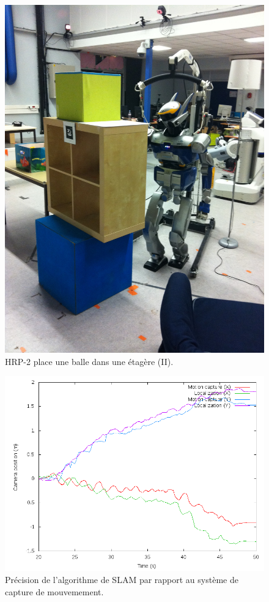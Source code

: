 \begin{figure}
  \begin{center}
    \includegraphics[width=.95\linewidth]{src/chap3-primitive-mouvement/demo2.jpg}
  \end{center}
  \caption{HRP-2 place une balle dans une étagère (II).}
\end{figure}


\begin{figure}
  \begin{center}
    \includegraphics[width=.95\linewidth]{src/chap3-primitive-mouvement/mocap.png}
  \end{center}
  \caption{Précision de l'algorithme de SLAM par rapport au système de
    capture de mouvemement.}
\end{figure}

